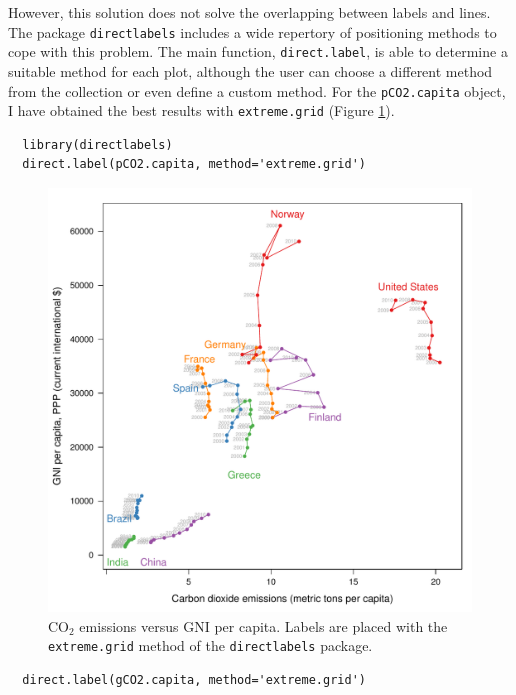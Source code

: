However, this solution does not solve the overlapping between labels
and lines. The package \texttt{directlabels} \cite{Hocking2013} includes a
wide repertory of positioning methods to cope with this problem. The
main function, \texttt{direct.label}, is able to determine a suitable method
for each plot, although the user can choose a different method from
the collection or even define a custom method. For the \texttt{pCO2.capita}
object, I have obtained the best results with \texttt{extreme.grid} (Figure
\ref{fig:CO2-GNI-DL}).


\lstset{language=r,label= ,caption= ,captionpos=b,numbers=none}
\begin{lstlisting}
  library(directlabels)
  direct.label(pCO2.capita, method='extreme.grid')
\end{lstlisting}

\begin{figure}[htbp]
\centering
\includegraphics[width=.9\linewidth]{figs/CO2_capitaDL.pdf}
\caption{\(\mathrm{CO_2}\) emissions versus GNI per capita. Labels are placed with the \texttt{extreme.grid} method of the \texttt{directlabels} package. \label{fig:CO2-GNI-DL}}
\end{figure}

\lstset{language=r,label= ,caption= ,captionpos=b,numbers=none}
\begin{lstlisting}
  direct.label(gCO2.capita, method='extreme.grid')
\end{lstlisting}

